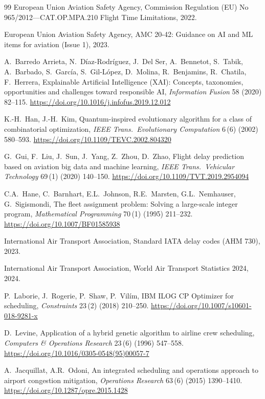 \documentclass[12pt,number]{elsarticle}
\begin{document}
\begin{thebibliography}{99}
 European Union Aviation Safety Agency, Commission Regulation (EU) No 965/2012---CAT.OP.MPA.210 Flight Time Limitations, 2022.

 European Union Aviation Safety Agency, AMC 20-42: Guidance on AI and ML items for aviation (Issue 1), 2023.

 A.~Barredo Arrieta, N.~D\'iaz-Rodr\'iguez, J.~Del Ser, A.~Bennetot, S.~Tabik, A.~Barbado, S.~Garc\'ia, S.~Gil-L\'opez, D.~Molina, R.~Benjamins, R.~Chatila, F.~Herrera, Explainable Artificial Intelligence (XAI): Concepts, taxonomies, opportunities and challenges toward responsible AI, \textit{Information Fusion} 58 (2020) 82--115. \url{https://doi.org/10.1016/j.infofus.2019.12.012}

 K.-H.~Han, J.-H.~Kim, Quantum-inspired evolutionary algorithm for a class of combinatorial optimization, \textit{IEEE Trans.\ Evolutionary Computation} 6\,(6) (2002) 580--593. \url{https://doi.org/10.1109/TEVC.2002.804320}

 G.~Gui, F.~Liu, J.~Sun, J.~Yang, Z.~Zhou, D.~Zhao, Flight delay prediction based on aviation big data and machine learning, \textit{IEEE Trans.\ Vehicular Technology} 69\,(1) (2020) 140--150. \url{https://doi.org/10.1109/TVT.2019.2954094}

 C.A.~Hane, C.~Barnhart, E.L.~Johnson, R.E.~Marsten, G.L.~Nemhauser, G.~Sigismondi, The fleet assignment problem: Solving a large-scale integer program, \textit{Mathematical Programming} 70\,(1) (1995) 211--232. \url{https://doi.org/10.1007/BF01585938}

 International Air Transport Association, Standard IATA delay codes (AHM 730), 2023.

 International Air Transport Association, World Air Transport Statistics 2024, 2024.

 P.~Laborie, J.~Rogerie, P.~Shaw, P.~Vil\'im, IBM ILOG CP Optimizer for scheduling, \textit{Constraints} 23\,(2) (2018) 210--250. \url{https://doi.org/10.1007/s10601-018-9281-x}

 D.~Levine, Application of a hybrid genetic algorithm to airline crew scheduling, \textit{Computers \& Operations Research} 23\,(6) (1996) 547--558. \url{https://doi.org/10.1016/0305-0548(95)00057-7}

 A.~Jacquillat, A.R.~Odoni, An integrated scheduling and operations approach to airport congestion mitigation, \textit{Operations Research} 63\,(6) (2015) 1390--1410. \url{https://doi.org/10.1287/opre.2015.1428}


\end{thebibliography}
\end{document}
